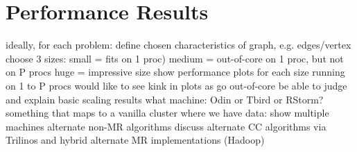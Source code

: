 \section{Performance Results}
\label{sec:results}

  ideally, for each problem:
    define chosen characteristics of graph, e.g. edges/vertex
    choose 3 sizes:
      small = fits on 1 proc)
      medium = out-of-core on 1 proc, but not on P procs
      huge = impressive size
  show performance plots for each size running on 1 to P procs
    would like to see kink in plots as go out-of-core
    be able to judge and explain basic scaling results
  what machine: Odin or Tbird or RStorm?
    something that maps to a vanilla cluster
  where we have data:
    show multiple machines
    alternate non-MR algorithms
      discuss alternate CC algorithms via Trilinos and hybrid
    alternate MR implementations (Hadoop)
